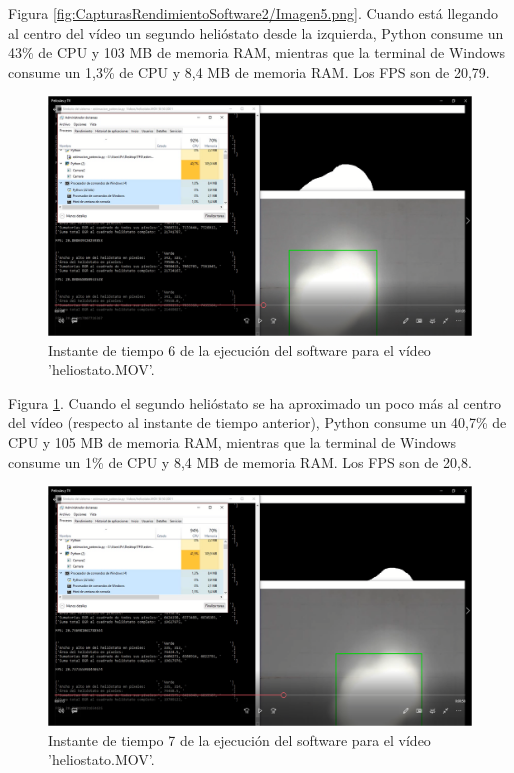 Figura \ref{fig:CapturasRendimientoSoftware2/Imagen5.png}. Cuando está llegando al centro del vídeo un segundo helióstato desde la izquierda, Python consume un 43\% de CPU y 103 MB de memoria RAM, mientras que la terminal de Windows consume un 1,3\% de CPU y 8,4 MB de memoria RAM. Los FPS son de 20,79.\\[20pt]

\begin{figure}[h!]
  	\centering
	\includegraphics[width=\textwidth]{CapturasRendimientoSoftware2/Imagen6.png}
	\caption{Instante de tiempo 6 de la ejecución del software para el vídeo 'heliostato.MOV'.
	\label{fig:CapturasRendimientoSoftware2/Imagen6.png}}
\end{figure}

Figura \ref{fig:CapturasRendimientoSoftware2/Imagen6.png}. Cuando el segundo helióstato se ha aproximado un poco más al centro del vídeo (respecto al instante de tiempo anterior), Python consume un 40,7\% de CPU y 105 MB de memoria RAM, mientras que la terminal de Windows consume un 1\% de CPU y 8,4 MB de memoria RAM. Los FPS son de 20,8.\\[20pt]

\begin{figure}[h!]
  	\centering
	\includegraphics[width=\textwidth]{CapturasRendimientoSoftware2/Imagen7.png}
	\caption{Instante de tiempo 7 de la ejecución del software para el vídeo 'heliostato.MOV'.
	\label{fig:CapturasRendimientoSoftware2/Imagen7.png}}
\end{figure}

